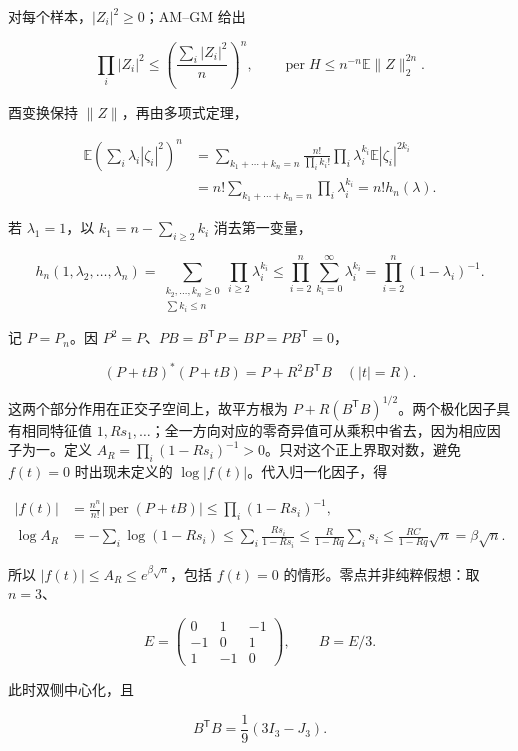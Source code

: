\documentclass[11pt,a4paper]{article}
\begin{document}
对每个样本，\(|Z_i|^2\ge0\)；AM--GM 给出

\[
\prod_i|Z_i|^2\le\left(\frac{\sum_i|Z_i|^2}{n}\right)^n,
\qquad \operatorname{per}H\le n^{-n}\mathbb E\|Z\|_2^{2n}.
\]

酉变换保持 \(\|Z\|\)，再由多项式定理，

\[
\begin{aligned}
\mathbb E\left(\sum_i\lambda_i|\zeta_i|^2\right)^n
&=\sum_{k_1+\cdots+k_n=n}\frac{n!}{\prod_i k_i!}
\prod_i\lambda_i^{k_i}\mathbb E|\zeta_i|^{2k_i}\\
&=n!\sum_{k_1+\cdots+k_n=n}\prod_i\lambda_i^{k_i}
=n!h_n(\lambda).
\end{aligned}
\]

若 \(\lambda_1=1\)，以 \(k_1=n-\sum_{i\ge2}k_i\) 消去第一变量，

\[
h_n(1,\lambda_2,\ldots,\lambda_n)
=\sum_{\substack{k_2,\ldots,k_n\ge0\\\sum k_i\le n}}\prod_{i\ge2}\lambda_i^{k_i}
\le\prod_{i=2}^n\sum_{k_i=0}^{\infty}\lambda_i^{k_i}
=\prod_{i=2}^n(1-\lambda_i)^{-1}.
\]

记 \(P=P_n\)。因 \(P^2=P\)、\(PB=B^{\mathsf T}P=BP=PB^{\mathsf T}=0\)，

\[
(P+tB)^*(P+tB)=P+R^2B^{\mathsf T}B
\quad(|t|=R).
\]

这两个部分作用在正交子空间上，故平方根为 \(P+R(B^{\mathsf T}B)^{1/2}\)。两个极化因子具有相同特征值 \(1,Rs_1,\ldots\)；全一方向对应的零奇异值可从乘积中省去，因为相应因子为一。定义 \(A_R=\prod_i(1-Rs_i)^{-1}>0\)。只对这个正上界取对数，避免 \(f(t)=0\) 时出现未定义的 \(\log|f(t)|\)。代入归一化因子，得

\[
\begin{aligned}
|f(t)|&=\frac{n^n}{n!}|\operatorname{per}(P+tB)|
\le\prod_i(1-Rs_i)^{-1},\\
\log A_R&=-\sum_i\log(1-Rs_i)\le\sum_i\frac{Rs_i}{1-Rs_i}
\le\frac R{1-Rq}\sum_i s_i
\le\frac{RC}{1-Rq}\sqrt n=\beta\sqrt n.
\end{aligned}
\]

所以 \(|f(t)|\le A_R\le e^{\beta\sqrt n}\)，包括 \(f(t)=0\) 的情形。零点并非纯粹假想：取 \(n=3\)、

\[
E=\begin{pmatrix}0&1&-1\\-1&0&1\\1&-1&0\end{pmatrix},\qquad B=E/3.
\]

此时双侧中心化，且

\[
B^{\mathsf T}B=\frac19(3I_3-J_3).
\]
\end{document}
